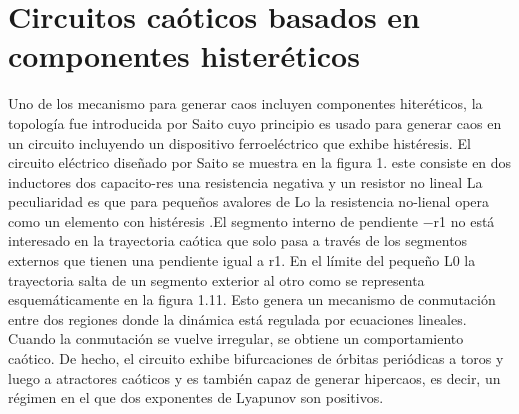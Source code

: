 \documentclass{article}
\begin{document}
\section{Circuitos caóticos basados en componentes histeréticos}
Uno de los mecanismo para generar caos incluyen componentes hiteréticos, la topología fue introducida por Saito cuyo principio es usado para generar caos en un circuito incluyendo un dispositivo ferroeléctrico que exhibe histéresis.
El circuito eléctrico diseñado por Saito se muestra en la figura 1. este consiste en dos inductores dos capacito-res una resistencia negativa y un resistor no lineal La peculiaridad es que para pequeños avalores de Lo la resistencia no-lienal opera como un elemento con histéresis .El segmento interno de pendiente −r1 no está interesado en la trayectoria caótica que solo pasa a través de los segmentos externos que tienen una pendiente igual a r1.
En el límite del pequeño L0 la trayectoria salta de un segmento exterior al otro como se representa esquemáticamente en la figura 1.11. Esto genera un mecanismo de conmutación entre dos regiones donde la dinámica está regulada por ecuaciones lineales. Cuando la conmutación se vuelve irregular, se obtiene un comportamiento caótico. De hecho, el circuito exhibe bifurcaciones de órbitas periódicas a toros y luego a atractores caóticos y es
también capaz de generar hipercaos, es decir, un régimen en el que dos exponentes de Lyapunov son positivos.
\end{document}
